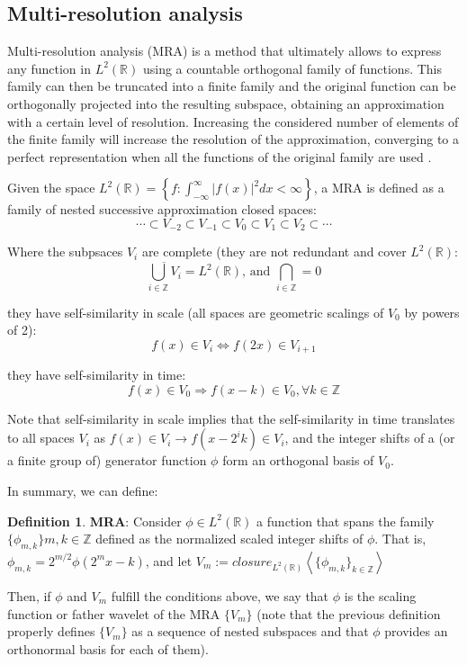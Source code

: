 \documentclass[12,twoside]{mammeTFM}
\theoremstyle{definition}
\newtheorem{definition}[thm]{Definition}
\theoremstyle{remark}
\newcommand{\Z}{\ensuremath{\mathbb{Z}}}
\newcommand{\R}{\ensuremath{\mathbb{R}}}
\begin{document}
\subsection{Multi-resolution analysis} \label{def:mra}
Multi-resolution analysis (MRA) is a method that ultimately allows to express any function in $L^2(\R)$ using a countable orthogonal family of functions. This family can then be truncated into a finite family and the original function can be orthogonally projected into the resulting subspace, obtaining an approximation with a certain level of resolution. Increasing the considered number of elements of the finite family will increase the resolution of the approximation, converging to a perfect representation when all the functions of the original family are used \cite{tour}.

Given the space $L^2(\R) = \left\{f: \int_{-\infty}^{\infty}{|f(x)|^2 dx < \infty} \right\}$, a MRA is defined as 
a family of nested successive approximation closed spaces:
$$ \cdots \subset V_{-2} \subset V_{-1} \subset V_0 \subset V_1 \subset V_2 \subset \cdots $$

Where the subpsaces $V_i$ are complete (they are not redundant and cover $L^2(\R)$:
$$\overline{\bigcup_{i\in{\Z}}{V_i}} = L^2(\R) \text{, and } \bigcap_{i\in{\Z}} = {0}$$

they have self-similarity in scale (all spaces are geometric scalings of $V_0$ by powers of 2):
$$ f(x) \in V_i \Leftrightarrow f(2x) \in V_{i + 1} $$

they have self-similarity in time:
$$ f(x) \in V_0 \Rightarrow f(x - k) \in V_0, \forall k \in \Z $$

Note that self-similarity in scale implies that the self-similarity in time translates to all spaces $V_i$ as $f(x) \in V_i \rightarrow f(x - 2^i k) \in V_i$, and the integer shifts of a (or a finite group of) generator function $\phi$ form an orthogonal basis of $V_0$. 

In summary, we can define:

\begin{definition} \label{def:mra} \textbf{MRA}: Consider $\phi \in L^2(\R)$ a function that spans the family $\{\phi_{m,k}\}m,k\in\Z$ defined as the normalized scaled integer shifts of $\phi$. That is, $\phi_{m,k} = 2^{m/2}\phi(2^m x - k)$, and let $V_m := closure_{L^2(\R)}\left\langle\{\phi_{m,k}\}_{k \in \Z}\right\rangle$ 
\end{definition}

Then, if $\phi$ and $V_m$ fulfill the conditions above, we say that $\phi$ is the scaling function or father wavelet of the MRA $\{V_m\}$ (note that the previous definition properly defines $\{V_m\}$ as a sequence of nested subspaces and that $\phi$ provides an orthonormal basis for each of them).
\end{document}
